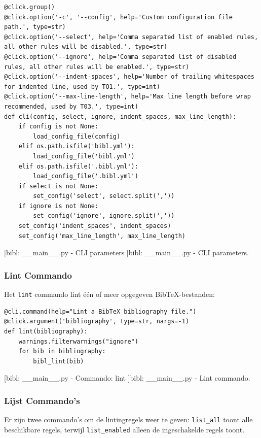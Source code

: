 \begin{verbatim}
@click.group()
@click.option('-c', '--config', help='Custom configuration file path.', type=str)
@click.option('--select', help='Comma separated list of enabled rules, all other rules will be disabled.', type=str)
@click.option('--ignore', help='Comma separated list of disabled rules, all other rules will be enabled.', type=str)
@click.option('--indent-spaces', help='Number of trailing whitespaces for indented line, used by TO1.', type=int)
@click.option('--max-line-length', help='Max line length before wrap recommended, used by T03.', type=int)
def cli(config, select, ignore, indent_spaces, max_line_length):
    if config is not None:
        load_config_file(config)
    elif os.path.isfile('bibl.yml'):
        load_config_file('bibl.yml')
    elif os.path.isfile('.bibl.yml'):
        load_config_file('.bibl.yml')
    if select is not None:
        set_config('select', select.split(','))
    if ignore is not None:
        set_config('ignore', ignore.split(','))
    set_config('indent_spaces', indent_spaces)
    set_config('max_line_length', max_line_length)
\end{verbatim}
[bibl: \_\_main\_\_.py - CLI parameters ]{bibl: \_\_main\_\_.py - CLI parameters. \label{lst:bibl_main_cli}}

\subsubsection{Lint Commando}

Het \texttt{lint} commando lint één of meer opgegeven BibTeX-bestanden:

\begin{verbatim}
@cli.command(help="Lint a BibTeX bibliography file.")
@click.argument('bibliography', type=str, nargs=-1)
def lint(bibliography):
    warnings.filterwarnings("ignore")
    for bib in bibliography:
        bibl_lint(bib)
\end{verbatim}
[bibl: \_\_main\_\_.py - Commando: lint ]{bibl: \_\_main\_\_.py - Lint commando. \label{lst:bibl_main_lint_command}}

\subsubsection{Lijst Commando's}

Er zijn twee commando's om de lintingregels weer te geven: \texttt{list\_all} toont alle beschikbare regels, terwijl \texttt{list\_enabled} alleen de ingeschakelde regels toont.

